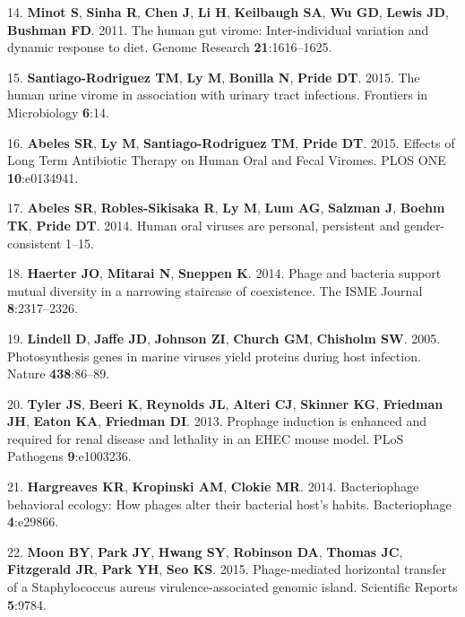 \documentclass[12pt,]{article}
\begin{document}
\hypertarget{ref-Minot:2011ez}{}
14. \textbf{Minot S}, \textbf{Sinha R}, \textbf{Chen J}, \textbf{Li H},
\textbf{Keilbaugh SA}, \textbf{Wu GD}, \textbf{Lewis JD},
\textbf{Bushman FD}. 2011. The human gut virome: Inter-individual
variation and dynamic response to diet. Genome Research
\textbf{21}:1616--1625.

\hypertarget{ref-SantiagoRodriguez:2015gd}{}
15. \textbf{Santiago-Rodriguez TM}, \textbf{Ly M}, \textbf{Bonilla N},
\textbf{Pride DT}. 2015. The human urine virome in association with
urinary tract infections. Frontiers in Microbiology \textbf{6}:14.

\hypertarget{ref-Abeles:2015dy}{}
16. \textbf{Abeles SR}, \textbf{Ly M}, \textbf{Santiago-Rodriguez TM},
\textbf{Pride DT}. 2015. Effects of Long Term Antibiotic Therapy on
Human Oral and Fecal Viromes. PLOS ONE \textbf{10}:e0134941.

\hypertarget{ref-Abeles:2014kj}{}
17. \textbf{Abeles SR}, \textbf{Robles-Sikisaka R}, \textbf{Ly M},
\textbf{Lum AG}, \textbf{Salzman J}, \textbf{Boehm TK}, \textbf{Pride
DT}. 2014. Human oral viruses are personal, persistent and
gender-consistent 1--15.

\hypertarget{ref-Haerter:2014ii}{}
18. \textbf{Haerter JO}, \textbf{Mitarai N}, \textbf{Sneppen K}. 2014.
Phage and bacteria support mutual diversity in a narrowing staircase of
coexistence. The ISME Journal \textbf{8}:2317--2326.

\hypertarget{ref-Lindell:2005gz}{}
19. \textbf{Lindell D}, \textbf{Jaffe JD}, \textbf{Johnson ZI},
\textbf{Church GM}, \textbf{Chisholm SW}. 2005. Photosynthesis genes in
marine viruses yield proteins during host infection. Nature
\textbf{438}:86--89.

\hypertarget{ref-Tyler:2013fl}{}
20. \textbf{Tyler JS}, \textbf{Beeri K}, \textbf{Reynolds JL},
\textbf{Alteri CJ}, \textbf{Skinner KG}, \textbf{Friedman JH},
\textbf{Eaton KA}, \textbf{Friedman DI}. 2013. Prophage induction is
enhanced and required for renal disease and lethality in an EHEC mouse
model. PLoS Pathogens \textbf{9}:e1003236.

\hypertarget{ref-Hargreaves:2014ja}{}
21. \textbf{Hargreaves KR}, \textbf{Kropinski AM}, \textbf{Clokie MR}.
2014. Bacteriophage behavioral ecology: How phages alter their bacterial
host's habits. Bacteriophage \textbf{4}:e29866.

\hypertarget{ref-Moon:2015fa}{}
22. \textbf{Moon BY}, \textbf{Park JY}, \textbf{Hwang SY},
\textbf{Robinson DA}, \textbf{Thomas JC}, \textbf{Fitzgerald JR},
\textbf{Park YH}, \textbf{Seo KS}. 2015. Phage-mediated horizontal
transfer of a Staphylococcus aureus virulence-associated genomic island.
Scientific Reports \textbf{5}:9784.
\end{document}
